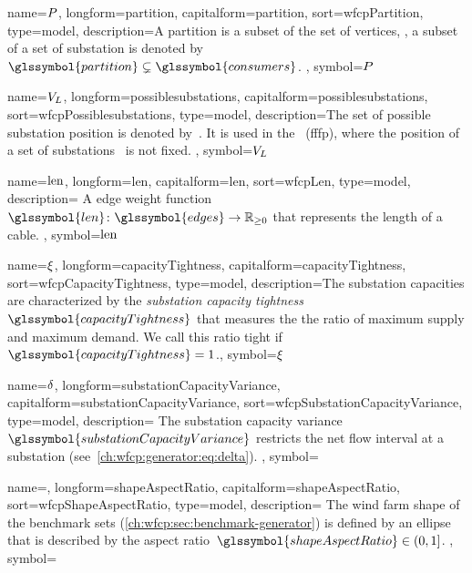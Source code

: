 {
    name={\ensuremath{\partition}},
    longform={partition},
    capitalform={partition},
    sort={wfcpPartition},
    type={model},
    description={A partition is a subset of the set of vertices, \eg, a subset
    of a set of substation is denoted by~$\glssymbol{partition}\subsetneq
    \glssymbol{consumers}$.
    },
    symbol={\ensuremath{\partition}}
}

{
    name={\ensuremath{\possiblesubstations}},
    longform={possiblesubstations},
    capitalform={possiblesubstations},
    sort={wfcpPossiblesubstations},
    type={model},
    description={The set of possible substation position is denoted
    by~. It is used in the~
    (\gls{fffp}), where the position of a set of
    substations~ is not fixed. },
    symbol={\ensuremath{\possiblesubstations}}
}

{
    name={\ensuremath{\len}},
    longform={len},
    capitalform={len},
    sort={wfcpLen},
    type={model},
    description={ A edge weight
    function~\mbox{$\glssymbol{len}\colon\glssymbol{edges}\to\posreals$} that
    represents the length of a cable. },
    symbol={\ensuremath{\len}}
}

{
    name={\ensuremath{\capacityTightness}},
    longform={capacityTightness},
    capitalform={capacityTightness},
    sort={wfcpCapacityTightness},
    type={model},
    description={The substation capacities are characterized by the
    \emph{substation capacity tightness}~$\glssymbol{capacityTightness}$ that
    measures the the ratio of maximum supply and maximum demand. We call this
    ratio tight if~$\glssymbol{capacityTightness}=1$.},
    symbol={\ensuremath{\capacityTightness}}
}

{
    name={\ensuremath{\substationCapacityVariance}},
    longform={substationCapacityVariance},
    capitalform={substationCapacityVariance},
    sort={wfcpSubstationCapacityVariance},
    type={model},
    description={ The substation capacity
    variance~$\glssymbol{substationCapacityVariance}$ restricts the net flow
    interval at a substation (see~\cref{ch:wfcp:generator:eq:delta}). },
    symbol={\substationCapacityVariance}
}

{
    name={\shapeAspectRatio},
    longform={shapeAspectRatio},
    capitalform={shapeAspectRatio},
    sort={wfcpShapeAspectRatio},
    type={model},
    description={ The wind farm shape of the benchmark sets
    (\cref{ch:wfcp:sec:benchmark-generator}) is defined by an ellipse that is
    described by the aspect ratio~$\glssymbol{shapeAspectRatio}\in(0,1]$.  },
    symbol={\shapeAspectRatio}
}

